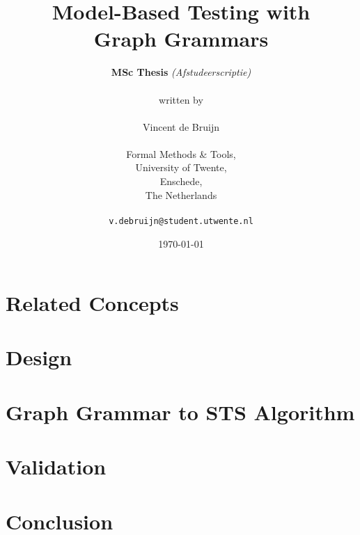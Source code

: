 \documentclass[a4paper]{report}
\theoremstyle{definition}
\begin{document}
	\title{\textbf{Model-Based Testing with\\Graph Grammars}}
	\author{\textbf{MSc Thesis} \textit{(Afstudeerscriptie)}\\
	\\
	written by
	\\
	\\
	Vincent de Bruijn\\
	\\
	Formal Methods \& Tools,\\
	University of Twente,
	\\Enschede,\\
	The Netherlands\\
	\\
	\texttt{v.debruijn@student.utwente.nl}}
	\date{\today}
	\maketitle
	
	
	
	\newpage
	\tableofcontents
  \newpage
  
  \newpage
	\chapter{Related Concepts}
	\newpage
	
	
	
	
	
	
	
	

	
	\newpage
	\chapter{Design}\label{chapter:design}
	
	\newpage
	\begin{comment}
	
	\end{comment}
	
	\newpage
	\chapter{Graph Grammar to STS Algorithm}\label{chapter:gg_to_sts}
	\newpage
	\begin{comment}
	
	
	\end{comment}
	
	\newpage
	\chapter{Validation}
	
	\newpage
	\begin{comment}
	
	
  \end{comment}
	\newpage
	\chapter{Conclusion}
	\newpage
	\begin{comment}
	
	
	
	\end{comment}
	

  \newpage
	{}
	
\end{document}
